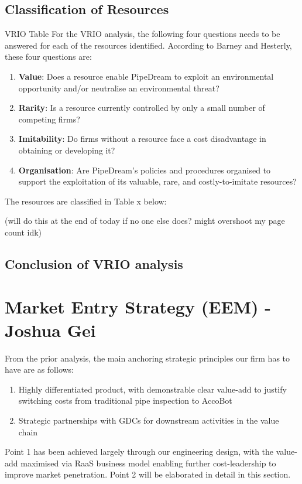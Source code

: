 \documentclass[11pt]{article}		%
\begin{document}
	
	\subsection{Classification of Resources}
	VRIO Table
    For the VRIO analysis, the following four questions needs to be answered for each of the resources identified. According to Barney and Hesterly, these four questions are:
        \begin{enumerate}
        \item \textbf{Value}: Does a resource enable PipeDream to exploit an environmental opportunity and/or neutralise an environmental threat?
        \item \textbf{Rarity}: Is a resource currently controlled by only a small number of competing firms?
        \item \textbf{Imitability}: Do firms without a resource face a cost disadvantage in obtaining or developing it?
        \item \textbf{Organisation}: Are PipeDream’s policies and procedures organised to support the exploitation of its valuable, rare, and costly-to-imitate resources?
    \end{enumerate}
    The resources are classified in Table x below: 
    
	(will do this at the end of today if no one else does? might overshoot my page count idk) 
	
	\subsection{Conclusion of VRIO analysis}
	
	\section[Market Entry Strategy - EEM]{Market Entry Strategy (EEM) - Joshua Gei} \label{marketEntry}
	From the prior analysis, the main anchoring strategic principles our firm has to have are as follows: 
    \begin{enumerate}
    \item Highly differentiated product, with demonstrable clear value-add to justify switching costs from traditional pipe inspection to AccoBot
    \item Strategic partnerships with GDCs for downstream activities in the value chain
    \end{enumerate}
Point 1 has been achieved largely through our engineering design, with the value-add maximised via RaaS business model enabling further cost-leadership to improve market penetration. Point 2 will be elaborated in detail in this section.  
\end{document}
